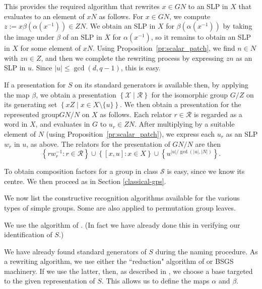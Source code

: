 \documentclass[12pt,twoside,reqno,psamsfonts]{amsproc}
\newcommand{\repgp}{{represented group}\xspace}
\numberwithin{equation}{section}
\numberwithin{figure}{section}
\newcounter{algorithm}
\theoremstyle{plain}
\theoremstyle{definition}
\theoremstyle{remark}
\providecommand{\abs}[1]{\left\lvert #1 \right\rvert}
\providecommand{\set}[1]{\left\lbrace #1 \right\rbrace}
\newcommand{\cS}{\mathcal{S}}
\begin{document}
This provides the required algorithm that rewrites 
$x \in GN$ to an SLP in $X$ that evaluates to an element of $xN$ as follows.
For $x \in GN$, we compute $z := x \beta(\alpha(x^{-1})) \in Z N$.
We obtain an SLP in $X$ for $\beta(\alpha(x^{-1}))$ by taking the
image under $\beta$ of an SLP in $\overline{X}$ for $\alpha(x^{-1})$,
so it remains to obtain an SLP in $X$ for some element of $xN$.
Using Proposition~\ref{pr:scalar_patch}, we find $n \in N$
with $zn \in Z$, and then we complete the rewriting process by
expressing $zn$ as an SLP in $u$.
Since $|u| \leqslant \gcd(d, q - 1)$, this is easy.

If a presentation for $S$ on its standard generators is available then, by
applying the map $\beta$, we obtain a presentation
$\set{\mathcal{X} \mid \mathcal{R}}$
for the isomorphic group $G/Z$ on its generating set
$\set{xZ \mid x \in X \setminus \{u\} }$.
We then obtain a presentation for the \repgp $GN/N$ on $X$ as follows.
Each relator $r \in \mathcal{R}$ is regarded as a word in $X$,
and evaluates in $G$ to $u_r \in Z N$.
After multiplying by a suitable
element of $N$ (using Proposition~\ref{pr:scalar_patch}),
we express each $u_r$ as an SLP $w_r$ in $u$, as above.
The relators for the presentation of $GN/N$ are then 
$$\set{r w_r^{-1}
  : r \in \mathcal{R}} \cup \set{[x, u] : x \in X} 
\cup \set{u^{\abs{u} / \gcd(\abs{u}, \abs{N})}}.$$

To obtain composition factors for a group in class $\cS$ is easy, since 
we know its centre. We then proceed as in Section \ref{classical-gps}.

We now list
the constructive recognition algorithms available for the various types
of simple groups.  Some are also applied to permutation group leaves.

\vspace*{0.15cm} 
We use the algorithm of \cite{MR1743388}.  
(In fact we have already done this in verifying our identification of $S$.) 

\vspace*{0.15cm} 
We have already found standard generators of $S$ during the naming procedure.
As a rewriting algorithm, we use either the ``reduction"
algorithm of \cite{ryba_trick} or BSGS machinery. 
If we use the latter, then, 
as described in \cite[\S 7.6]{MR2258009}, we choose a base 
targeted to the given representation of $S$.
This allows us to define the maps $\alpha$ and $\beta$.
\end{document}
